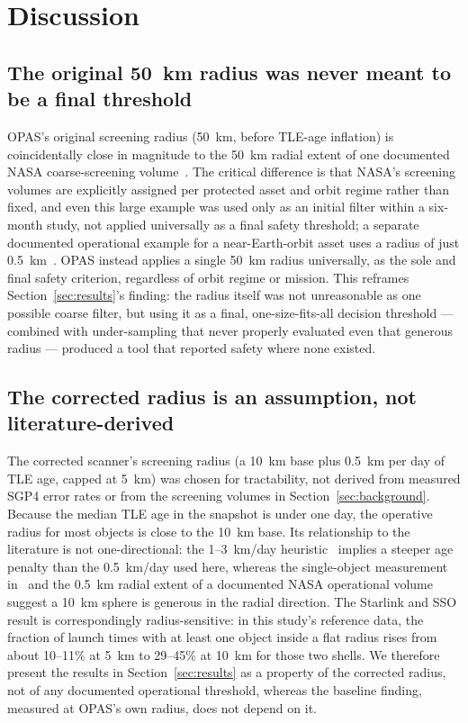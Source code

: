 \documentclass[11pt,a4paper]{article}
\begin{document}
\section{Discussion}
\label{sec:discussion}

\subsection{The original 50~km radius was never meant to be a final threshold}

OPAS's original screening radius (50~km, before TLE-age inflation) is
coincidentally close in magnitude to the 50~km radial extent of one
documented NASA coarse-screening volume~\cite{nasa_screening}. The critical
difference is that NASA's screening volumes are explicitly assigned per
protected asset and orbit regime rather than fixed, and even this large
example was used only as an initial filter within a six-month study, not
applied universally as a final safety threshold; a separate documented
operational example for a near-Earth-orbit asset uses a radius of just
0.5~km~\cite{nasa_screening,nasa_handbook}. OPAS instead applies a single
50~km radius universally, as the sole and final safety criterion,
regardless of orbit regime or mission. This reframes
Section~\ref{sec:results}'s finding: the radius itself was not
unreasonable as one possible coarse filter, but using it as a final,
one-size-fits-all decision threshold --- combined with under-sampling that
never properly evaluated even that generous radius --- produced a tool
that reported safety where none existed.

\subsection{The corrected radius is an assumption, not literature-derived}

The corrected scanner's screening radius (a 10~km base plus 0.5~km per day of
TLE age, capped at 5~km) was chosen for tractability, not derived from
measured SGP4 error rates or from the screening volumes in
Section~\ref{sec:background}. Because the median TLE age in the snapshot is
under one day, the operative radius for most objects is close to the 10~km
base. Its relationship to the literature is not one-directional: the
1--3~km/day heuristic~\cite{jaxsgp4} implies a steeper age penalty than the
0.5~km/day used here, whereas the single-object measurement
in~\cite{afit_sgp4} and the 0.5~km radial extent of a documented NASA
operational volume~\cite{nasa_screening,nasa_handbook} suggest a 10~km sphere is generous in the radial
direction. The Starlink and SSO result is correspondingly radius-sensitive: in
this study's reference data, the fraction of launch times with at least one
object inside a flat radius rises from about 10--11\% at 5~km to 29--45\% at
10~km for those two shells. We therefore present the results in
Section~\ref{sec:results} as a property of the corrected radius, not of any
documented operational threshold, whereas the baseline finding, measured at
OPAS's own radius, does not depend on it.
\end{document}
